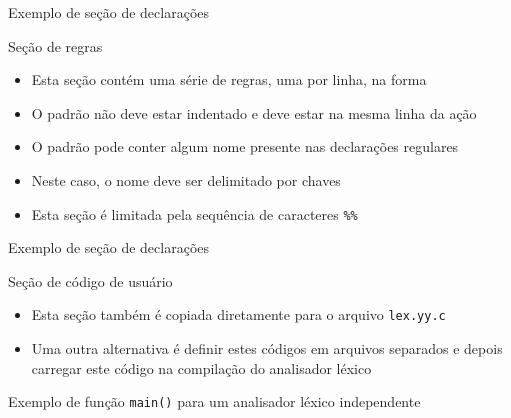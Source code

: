 \begin{frame}[fragile]{Exemplo de seção de declarações}
\end{frame}

\begin{frame}[fragile]{Seção de regras}

    \begin{itemize}
        \item Esta seção contém uma série de regras, uma por linha, na forma
        \pause

        \item O padrão não deve estar indentado e deve estar na mesma linha da ação
        \pause

        \item O padrão pode conter algum nome presente nas declarações regulares
        \pause

        \item Neste caso, o nome deve ser delimitado por chaves
        \pause

        \item Esta seção é limitada pela sequência de caracteres \verb|%%|
    \end{itemize}

\end{frame}

\begin{frame}[fragile]{Exemplo de seção de declarações}
\end{frame}

\begin{frame}[fragile]{Seção de código de usuário}

    \begin{itemize}
        \item Esta seção também é copiada diretamente para o arquivo \texttt{lex.yy.c}
        \pause

        \item Uma outra alternativa é definir estes códigos em arquivos separados e depois carregar este código na compilação do analisador léxico
        \pause

    \end{itemize}

\end{frame}

\begin{frame}[fragile]{Exemplo de função {\tt main()} para um analisador léxico independente}


\end{frame}
